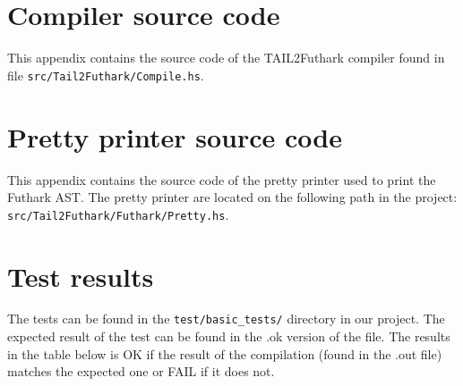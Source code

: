\documentclass[11pt]{article}
\begin{document}
\lstset{breaklines=true}



\newpage

\section{Compiler source code}
\label{app:impl}

This appendix contains the source code of the TAIL2Futhark compiler found in file {\tt src/Tail2Futhark/Compile.hs}. 


\newpage

\section{Pretty printer source code}
\label{app:pretty}

This appendix contains the source code of the pretty printer used to print the Futhark AST. The pretty printer are located on the following path in the project: {\tt src/Tail2Futhark/Futhark/Pretty.hs}. 



\newpage

\section{Test results}
\label{app:testresults}
The tests can be found in the {\tt test/basic\_tests/} directory in our project.
The expected result of the test can be found in the .ok version of the file. The results in the table below is OK if the result of the compilation (found in the .out file) matches the expected one or FAIL if it does not.
\end{document}
